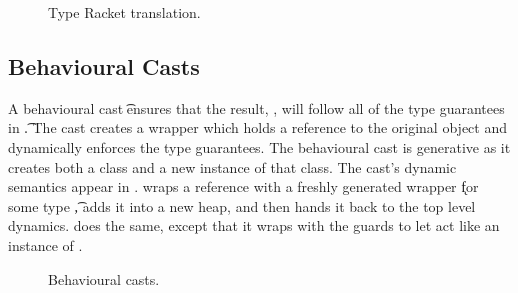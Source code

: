 \documentclass[a4paper,USenglish]{tex/lipics-v2016}
\begin{document}
\begin{figure}[h!]
\begin{mathpar}

\end{mathpar}
\caption{Type Racket translation.}\label{fb}
\end{figure}


\subsection{Behavioural Casts}

A behavioural cast \BehCast\t\a ensures that the result, \ap, will follow
all of the type guarantees in \t. The cast creates a wrapper which holds a
reference to the original object \a and dynamically enforces the type
guarantees. The behavioural cast is generative as it creates both a class
and a new instance of that class. The cast's dynamic semantics appear in
.  wraps a reference \a with a freshly generated
wrapper \k for some type \t, adds it into a new heap, and then hands it back
to the top level dynamics.  does the same, except that it wraps
\a with the guards to let \a act like an instance of \any.

\begin{figure}[!ht]
\vspace{-2mm}

{  \small
  \begin{mathpar}

\end{mathpar}}  

\vspace{-2mm}
\caption{Behavioural casts.}\label{behave}
\end{figure}
\end{document}

